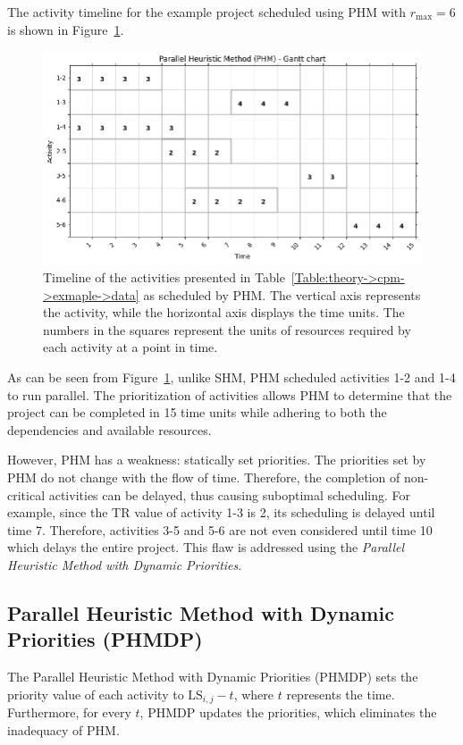 The activity timeline for the example project scheduled using PHM with $r_\mathrm{max} = 6$ is shown in Figure~\ref{Figure:theory->phm->example->timeline}.

\begin{figure}[ht!]
	\centering
	\includegraphics[width=\linewidth]{images/phm_example_project.png}
	\caption{Timeline of the activities presented in Table~\ref{Table:theory->cpm->exmaple->data} as scheduled by PHM.
		The vertical axis represents the activity, while the horizontal axis displays the time units.
		The numbers in the squares represent the units of resources required by each activity at a point in time.
	}
	\label{Figure:theory->phm->example->timeline}
\end{figure}

As can be seen from Figure~\ref{Figure:theory->phm->example->timeline}, unlike SHM, PHM scheduled activities 1-2 and 1-4 to run parallel.
The prioritization of activities allows PHM to determine that the project can be completed in 15 time units while adhering to both the dependencies and available resources.

However, PHM has a weakness: statically set priorities.
The priorities set by PHM do not change with the flow of time.
Therefore, the completion of non-critical activities can be delayed, thus causing suboptimal scheduling.
For example, since the TR value of activity 1-3 is 2, its scheduling is delayed until time 7.
Therefore, activities 3-5 and 5-6 are not even considered until time 10 which delays the entire project.
This flaw is addressed using the \textit{Parallel Heuristic Method with Dynamic Priorities}.



\subsection{Parallel Heuristic Method with Dynamic Priorities (PHMDP)}
The Parallel Heuristic Method with Dynamic Priorities (PHMDP) sets the priority value of each activity to $\mathrm{LS}_{i, j} - t$, where $t$ represents the time.
Furthermore, for every $t$, PHMDP updates the priorities, which eliminates the inadequacy of PHM.

